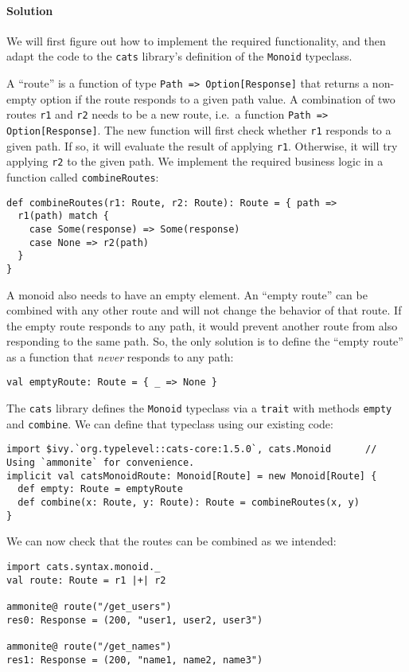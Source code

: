 \paragraph{Solution}

We will first figure out how to implement the required functionality,
and then adapt the code to the \texttt{cats} library's definition
of the \lstinline!Monoid! typeclass.

A ``route'' is a function of type \lstinline!Path => Option[Response]!
that returns a non-empty option if the route responds to a given path
value. A combination of two routes \lstinline!r1! and \lstinline!r2!
needs to be a new route, i.e.~a function \lstinline!Path => Option[Response]!.
The new function will first check whether \lstinline!r1! responds
to a given path. If so, it will evaluate the result of applying \lstinline!r1!.
Otherwise, it will try applying \lstinline!r2! to the given path.
We implement the required business logic in a function called \lstinline!combineRoutes!:
\begin{lstlisting}
def combineRoutes(r1: Route, r2: Route): Route = { path =>
  r1(path) match {
    case Some(response) => Some(response)
    case None => r2(path)
  }
}
\end{lstlisting}

A monoid also needs to have an empty element. An ``empty route''
can be combined with any other route and will not change the behavior
of that route. If the empty route responds to any path, it would prevent
another route from also responding to the same path. So, the only
solution is to define the ``empty route'' as a function that \emph{never}
responds to any path:
\begin{lstlisting}
val emptyRoute: Route = { _ => None }
\end{lstlisting}

The \texttt{cats} library defines the \lstinline!Monoid! typeclass
via a \lstinline!trait! with methods \lstinline!empty! and \lstinline!combine!.
We can define that typeclass using our existing code:
\begin{lstlisting}
import $ivy.`org.typelevel::cats-core:1.5.0`, cats.Monoid      // Using `ammonite` for convenience.
implicit val catsMonoidRoute: Monoid[Route] = new Monoid[Route] {
  def empty: Route = emptyRoute
  def combine(x: Route, y: Route): Route = combineRoutes(x, y)
}
\end{lstlisting}
We can now check that the routes can be combined as we intended:
\begin{lstlisting}
import cats.syntax.monoid._
val route: Route = r1 |+| r2

ammonite@ route("/get_users")
res0: Response = (200, "user1, user2, user3")

ammonite@ route("/get_names")
res1: Response = (200, "name1, name2, name3")
\end{lstlisting}

